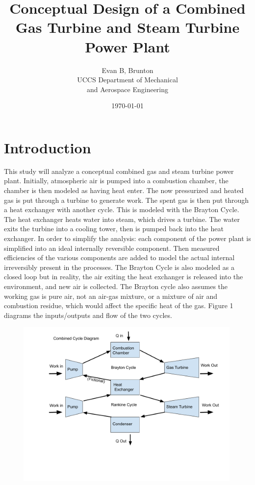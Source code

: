 \documentclass{article}
\title{Conceptual Design of a Combined Gas Turbine and Steam Turbine Power Plant}
\date{\today}
\author{Evan B, Brunton\\[2ex]
    UCCS Department of Mechanical\\
    and Aerospace Engineering
}
\begin{document}
\maketitle

\section{Introduction}

    This study will analyze a conceptual combined gas and steam turbine power plant. Initially, atmospheric air is pumped into a combustion chamber, the chamber is then modeled as having heat enter. The now pressurized and heated gas is put through a turbine to generate work. The spent gas is then put through a heat exchanger with another cycle. This is modeled with the Brayton Cycle. The heat exchanger heats water into steam, which drives a turbine. The water exits the turbine into a cooling tower, then is pumped back into the heat exchanger. In order to simplify the analysis: each component of the power plant is simplified into an ideal internally reversible component. Then measured efficiencies of the various components are added to model the actual internal irreversibly present in the processes. The Brayton Cycle is also modeled as a closed loop but in reality, the air exiting the heat exchanger is released into the environment, and new air is collected. The Brayton cycle also assumes the working gas is pure air, not an air-gas mixture, or a mixture of air and combustion residue, which would affect the specific heat of the gas. Figure 1 diagrams the inputs/outputs and flow of the two cycles.
    
\begin{figure}[!htbp]
\centering
  \includegraphics[page=1,trim=10mm 40mm 10mm 0mm,clip,width=0.99\textwidth]{Combined Cycle Diagram (1).pdf}
  \caption{}
  \label{fig:epsfig}
\end{figure}
\end{document}
